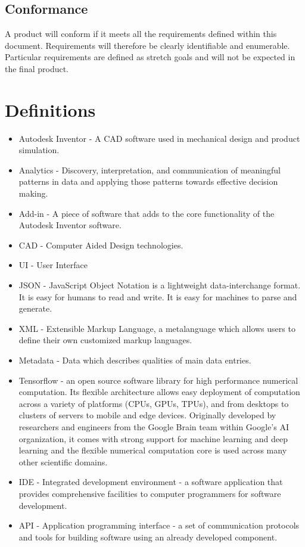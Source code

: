 \documentclass[onecolumn, draftclsnofoot,10pt, compsoc]{IEEEtran}
\begin{document}
\subsection{Conformance}
A product will conform if it meets all the requirements defined within this document. Requirements will therefore be clearly identifiable and enumerable. Particular requirements are defined as stretch goals and will not be expected in the final product. 
\null\newpage
\section{Definitions}
\begin{itemize}
\item Autodesk Inventor - A CAD software used in mechanical design and product simulation.
\item Analytics - Discovery, interpretation, and communication of meaningful patterns in data and applying those patterns towards effective decision making.
\item Add-in - A piece of software that adds to the core functionality of the Autodesk Inventor software.
\item CAD - Computer Aided Design technologies.
\item UI - User Interface
\item JSON - JavaScript Object Notation is a lightweight data-interchange format. It is easy for humans to read and write. It is easy for machines to parse and generate.
\item XML - Extensible Markup Language, a metalanguage which allows users to define their own customized markup languages.
\item Metadata - Data which describes qualities of main data entries.
\item Tensorflow - an open source software library for high performance numerical computation. Its flexible architecture allows easy deployment of computation across a variety of platforms (CPUs, GPUs, TPUs), and from desktops to clusters of servers to mobile and edge devices. Originally developed by researchers and engineers from the Google Brain team within Google’s AI organization, it comes with strong support for machine learning and deep learning and the flexible numerical computation core is used across many other scientific domains.
\item IDE - Integrated development environment - a software application that provides comprehensive facilities to computer programmers for software development. 
\item API - Application programming interface - a set of communication protocols and tools for building software using an already developed component. 

\end{itemize}
\end{document}

